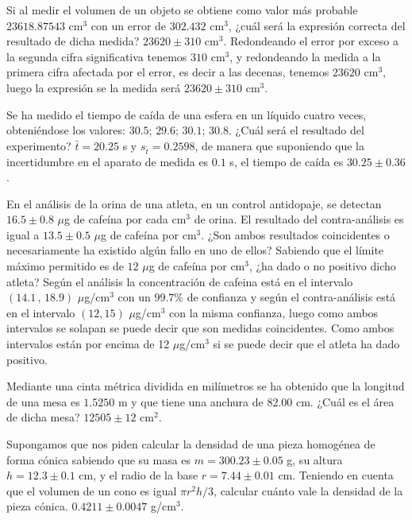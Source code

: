 
{Si al medir el volumen de un objeto se obtiene como valor más probable $23618.87543$ cm$^3$ con un error de $302.432$
cm$^3$, ¿cuál será la expresión correcta del resultado de dicha medida?     
}
{$23620\pm310$ cm$^3$.
}
{Redondeando el error por exceso a la segunda cifra significativa tenemos $310$ cm$^3$, y redondeando la medida a la
primera cifra afectada por el error, es decir a las decenas, tenemos $23620$ cm$^3$, luego la expresión se la medida
será $23620\pm310$ cm$^3$.}


{Se ha medido el tiempo de caída de una esfera en un líquido cuatro veces, obteniéndose los valores: $30.5$; $29.6$;
$30.1$; $30.8$. ¿Cuál será el resultado del experimento?}
{$\bar t=20.25$ s y $s_{\bar t}=0.2598$, de manera que suponiendo que la incertidumbre en el aparato de medida es
$0.1$ s, el tiempo de caída es $30.25\pm0.36$.
}
{}


{En el análisis de la orina de una atleta, en un control antidopaje, se detectan $16.5 \pm 0.8$ $\mu$g de cafeína por
cada cm$^3$ de orina. El resultado del contra-análisis es igual a $13.5 \pm 0.5$ $\mu$g de cafeína por cm$^3$. ¿Son
ambos resultados coincidentes o necesariamente ha existido algún fallo en uno de ellos? Sabiendo que el límite máximo
permitido es de $12$ $\mu$g de cafeína por cm$^3$, ¿ha dado o no positivo dicho atleta?
}
{Según el análisis la concentración de cafeina está en el intervalo $(14.1\,,\,18.9)$ $\mu$g/cm$^3$ con un $99.7\%$ de
confianza y según el contra-análisis está en el intervalo $(12,15)$ $\mu$g/cm$^3$ con la misma confianza, luego como
ambos intervalos se solapan se puede decir que son medidas coincidentes. Como ambos intervalos están por encima de 12
$\mu$g/cm$^3$ si se puede decir que el atleta ha dado positivo.
}
{}


{Mediante una cinta métrica dividida en milímetros se ha obtenido que la longitud de una mesa es $1.5250$ m y que tiene
una anchura de $82.00$ cm. ¿Cuál es el área de dicha mesa?
}
{$12505\pm12$ cm$^2$.
}
{}


{Supongamos que nos piden calcular la densidad de una pieza homogénea de forma cónica sabiendo que su masa es $m=
300.23\pm 0.05$ g, su altura $h=12.3 \pm 0.1$ cm, y el radio de la base $r=7.44 \pm 0.01$ cm. Teniendo en cuenta que el
volumen de un cono es igual $\pi r^2 h/3$, calcular cuánto vale la densidad de la pieza cónica.
}
{$0.4211\pm0.0047$ g/cm$^3$.
}
{}


